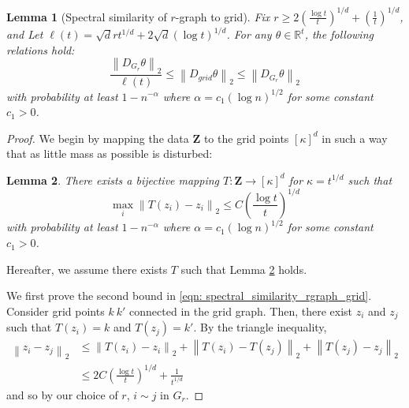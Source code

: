 \documentclass{article}
\newcommand{\Reals}{\mathbb{R}}
\newcommand{\norm}[1]{\left\lVert#1\right\rVert}
\newcommand{\1}{\mathbb{I}}
\newcommand{\Zbf}{\mathbf{Z}}
\theoremstyle{alden}
\theoremstyle{aldenthm}
\newtheorem{lemma}{Lemma}
\theoremstyle{definition}
\theoremstyle{remark}
\begin{document}
\begin{lemma}[Spectral similarity of $r$-graph to grid]
	\label{lem: spectral_similarity_rgraph_grid}
	Fix $r \geq 2 \left(\frac{\log t}{t}\right)^{1/d} + (\frac{1}{t})^{1/d}$, and Let $\ell(t) = \sqrt{d} r t^{1/d} + 2\sqrt{d}(\log t)^{1/d}$. For any $\theta \in \Reals^t$, the following relations hold:
	\begin{equation}
	\label{eqn: spectral_similarity_rgraph_grid}
	\frac{\norm{D_{G_r}\theta}_2}{\ell(t)} \leq \norm{D_{grid}\theta}_2 \leq \norm{D_{G_r}\theta}_2
	\end{equation}
	with probability at least $1 - n^{-\alpha}$ where $\alpha = c_1 (\log n)^{1/2}$ for some constant $c_1 > 0$.
\end{lemma}
\begin{proof}
	We begin by mapping the data $\Zbf$ to the grid points $[\kappa]^d$ in such a way that as little mass as possible is disturbed:
	\begin{lemma}
		\label{lem: mass_transport_mapping}
		There exists a bijective mapping $T: \Zbf \to [\kappa]^d$ for $\kappa = t^{1/d}$ such that
		\begin{equation*}
		\max_{i} \norm{T(z_i) - z_i}_2 \leq C\left(\frac{\log t}{t}\right)^{1/d}
		\end{equation*}
		with probability at least $1 - n^{-\alpha}$ where $\alpha = c_1 (\log n)^{1/2}$ for some constant $c_1 > 0$.
	\end{lemma}
	Hereafter, we assume there exists $T$ such that Lemma \ref{lem: mass_transport_mapping} holds.
	
	We first prove the second bound in \eqref{eqn: spectral_similarity_rgraph_grid}.  Consider grid points $k ~ k'$ connected in the grid graph. Then, there exist $z_i$ and $z_j$ such that $T(z_i) = k$ and $T(z_j) = k'$. By the triangle inequality,
	\begin{align*}
	\norm{z_i - z_j}_2 & \leq \norm{T(z_i) - z_i}_2 + \norm{T(z_i) - T(z_j)}_2 + \norm{T(z_j) - z_j}_2 \\
	& \leq 2C\left(\frac{\log t}{t}\right)^{1/d} + \frac{1}{t^{1/d}}
	\end{align*}
	and so by our choice of $r$, $i \sim j$ in $G_r$.
	

\end{proof}
\end{document}
